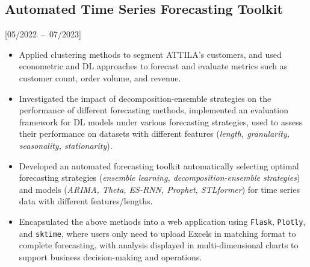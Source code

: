 \documentclass{mycv}
\begin{document}



\subsection{Automated Time Series Forecasting Toolkit}[05/2022~--~07/2023]

\begin{itemize}
  \itemsep 0.3em
  \item Applied clustering methods to segment ATTILA's customers, and used econometric and DL approaches to forecast and evaluate metrics such as customer count, order volume, and revenue.
  \item Investigated the impact of decomposition-ensemble strategies on the performance of different forecasting methods, implemented an evaluation framework for DL models under various forecasting strategies, used to assess their performance on datasets with different features (\emph{length, granularity, seasonality, stationarity}).
  \item Developed an automated forecasting toolkit automatically selecting optimal forecasting strategies (\emph{ensemble learning, decomposition-ensemble strategies}) and models (\emph{ARIMA, Theta, ES-RNN, Prophet, STLformer}) for time series data with different features/lengths.
  \item Encapsulated the above methods into a web application using \texttt{Flask}, \texttt{Plotly}, and \texttt{sktime}, where users only need to upload Excels in matching format to complete forecasting, with analysis displayed in multi-dimensional charts to support business decision-making and operations.
\end{itemize}

\vspace{-\parskip}
\end{document}
